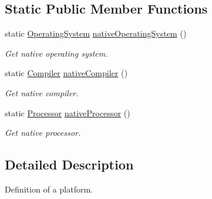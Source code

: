 \subsection*{Static Public Member Functions}
\begin{DoxyCompactItemize}
\item 
static \hyperlink{namespace_mdt_1_1_deploy_utils_a998c3ae583084b7cac9e9a71b9e1ac32}{Operating\+System} \hyperlink{class_mdt_1_1_deploy_utils_1_1_platform_aa9c466ca43cea94e751b73f8270fe4bb}{native\+Operating\+System} ()\hypertarget{class_mdt_1_1_deploy_utils_1_1_platform_aa9c466ca43cea94e751b73f8270fe4bb}{}\label{class_mdt_1_1_deploy_utils_1_1_platform_aa9c466ca43cea94e751b73f8270fe4bb}

\begin{DoxyCompactList}\small\item\em Get native operating system. \end{DoxyCompactList}\item 
static \hyperlink{namespace_mdt_1_1_deploy_utils_aabc55fa0829b602f94e42f55f66173e3}{Compiler} \hyperlink{class_mdt_1_1_deploy_utils_1_1_platform_aeca6535d32ac63294f3f8dfcb9b996a7}{native\+Compiler} ()\hypertarget{class_mdt_1_1_deploy_utils_1_1_platform_aeca6535d32ac63294f3f8dfcb9b996a7}{}\label{class_mdt_1_1_deploy_utils_1_1_platform_aeca6535d32ac63294f3f8dfcb9b996a7}

\begin{DoxyCompactList}\small\item\em Get native compiler. \end{DoxyCompactList}\item 
static \hyperlink{namespace_mdt_1_1_deploy_utils_aa3c03f55a06150c118902133f9a74b6f}{Processor} \hyperlink{class_mdt_1_1_deploy_utils_1_1_platform_afcf216e9f71ad3df91588dd1e96e05ee}{native\+Processor} ()\hypertarget{class_mdt_1_1_deploy_utils_1_1_platform_afcf216e9f71ad3df91588dd1e96e05ee}{}\label{class_mdt_1_1_deploy_utils_1_1_platform_afcf216e9f71ad3df91588dd1e96e05ee}

\begin{DoxyCompactList}\small\item\em Get native processor. \end{DoxyCompactList}\end{DoxyCompactItemize}


\subsection{Detailed Description}
Definition of a platform. 

